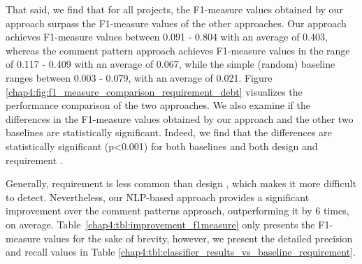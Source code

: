 That said, we find that for all projects, the F1-measure values obtained by our approach surpass the F1-measure values of the other approaches. Our approach achieves F1-measure values between 0.091 - 0.804 with an average of 0.403, whereas the comment pattern approach achieves F1-measure values in the range of 0.117 - 0.409 with an average of 0.067, while the simple (random) baseline ranges between 0.003 - 0.079, with an average of 0.021. Figure \ref{chap4:fig:f1_measure_comparison_requirement_debt} visualizes the performance comparison of the two approaches. We also examine if the differences in the F1-measure values obtained by our approach and the other two baselines are statistically significant. Indeed, we find that the differences are statistically significant (p\textless0.001) for both baselines and both design and requirement \SATD.

Generally, requirement \SATD is less common than design \SATD, which makes it more difficult to detect. Nevertheless, our NLP-based approach provides a significant improvement over the comment patterns approach, outperforming it by 6 times, on average. Table~\ref{chap4:tbl:improvement_f1measure} only presents the F1-measure values for the sake of brevity, however, we present the detailed precision and recall values in Table \ref{chap4:tbl:classifier_results_vs_baseline_requirement}.


